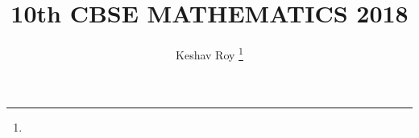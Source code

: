 \documentclass[journal,12pt,twocolumn]{IEEEtran}
\DeclareMathOperator*{\Res}{Res}
\begin{document}
\newtheorem{theorem}{Theorem}[section]
\newtheorem{problem}{Problem}
\newtheorem{proposition}{Proposition}[section]
\newtheorem{lemma}{Lemma}[section]
\newtheorem{corollary}[theorem]{Corollary}
\newtheorem{example}{Example}[section]
\newtheorem{definition}[problem]{Definition}
\newcommand{\BEQA}{\begin{eqnarray}}
\newcommand{\EEQA}{\end{eqnarray}}
\newcommand{\define}{\stackrel{\triangle}{=}}

\providecommand{\mbf}{\mathbf}
\providecommand{\pr}[1]{\ensuremath{\Pr\left(#1\right)}}
\providecommand{\qfunc}[1]{\ensuremath{Q\left(#1\right)}}
\providecommand{\sbrak}[1]{\ensuremath{{}\left[#1\right]}}
\providecommand{\lsbrak}[1]{\ensuremath{{}\left[#1\right.}}
\providecommand{\rsbrak}[1]{\ensuremath{{}\left.#1\right]}}
\providecommand{\brak}[1]{\ensuremath{\left(#1\right)}}
\providecommand{\lbrak}[1]{\ensuremath{\left(#1\right.}}
\providecommand{\rbrak}[1]{\ensuremath{\left.#1\right)}}
\providecommand{\cbrak}[1]{\ensuremath{\left\{#1\right\}}}
\providecommand{\lcbrak}[1]{\ensuremath{\left\{#1\right.}}
\providecommand{\rcbrak}[1]{\ensuremath{\left.#1\right\}}}
\theoremstyle{remark}
\newtheorem{rem}{Remark}
\newcommand{\sgn}{\mathop{\mathrm{sgn}}}
\providecommand{\abs}[1]{\left\vert#1\right\vert}
\providecommand{\res}[1]{\Res\displaylimits_{#1}} 
\providecommand{\norm}[1]{\left\lVert#1\right\rVert}
\providecommand{\mtx}[1]{\mathbf{#1}}
\providecommand{\mean}[1]{E\left[ #1 \right]}
\providecommand{\fourier}{\overset{\mathcal{F}}{ \rightleftharpoons}}
\providecommand{\system}{\overset{\mathcal{H}}{ \longleftrightarrow}}
\newcommand{\solution}{\noindent \textbf{Solution: }}
\newcommand{\cosec}{\,\text{cosec}\,}
\providecommand{\dec}[2]{\ensuremath{\overset{#1}{\underset{#2}{\gtrless}}}}
\newcommand{\myvec}[1]{\ensuremath{\begin{pmatrix}#1\end{pmatrix}}}
\newcommand{\mydet}[1]{\ensuremath{\begin{vmatrix}#1\end{vmatrix}}}
\makeatletter
{}
\makeatother
\let\StandardTheFigure\thefigure
\let\vec\mathbf
\renewcommand{\thefigure}{\theproblem}
\def\putbox#1#2#3{\makebox[0in][l]{\makebox[#1][l]{}\raisebox{\baselineskip}[0in][0in]{\raisebox{#2}[0in][0in]{#3}}}}
     \def\rightbox#1{\makebox[0in][r]{#1}}
     \def\centbox#1{\makebox[0in]{#1}}
     \def\topbox#1{\raisebox{-\baselineskip}[0in][0in]{#1}}
     \def\midbox#1{\raisebox{-0.5\baselineskip}[0in][0in]{#1}}
\vspace{3cm}
\title{
	10th CBSE MATHEMATICS 2018
}
\author{ Keshav Roy
	\thanks{}
	
}
\maketitle
\newpage
\bigskip
\renewcommand{\thefigure}{\theenumi}
\renewcommand{\thetable}{\theenumi}
\end{document}
